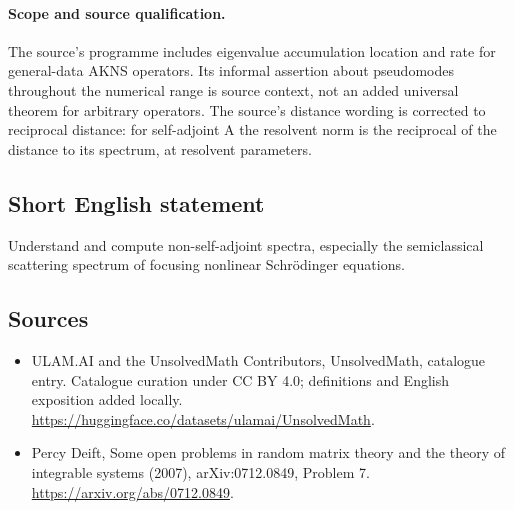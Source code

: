 \paragraph{Scope and source qualification.}The source’s programme includes eigenvalue accumulation location and rate for general-data AKNS operators. Its informal assertion about pseudomodes throughout the numerical range is source context, not an added universal theorem for arbitrary operators. The source’s distance wording is corrected to reciprocal distance: for self-adjoint A the resolvent norm is the reciprocal of the distance to its spectrum, at resolvent parameters.
\subsection{Short English statement}
Understand and compute non-self-adjoint spectra, especially the semiclassical scattering spectrum of focusing nonlinear Schrödinger equations.
\subsection{Sources}
\begin{itemize}
\item[\hypertarget{source:statement:1}{S1}] ULAM.AI and the UnsolvedMath Contributors, UnsolvedMath, catalogue entry. Catalogue curation under CC BY 4.0; definitions and English exposition added locally.
\url{https://huggingface.co/datasets/ulamai/UnsolvedMath}.
\item[\hypertarget{source:statement:2}{S2}] Percy Deift, Some open problems in random matrix theory and the theory of integrable systems (2007), arXiv:0712.0849, Problem 7.
\url{https://arxiv.org/abs/0712.0849}.
\end{itemize}
\label{end:statement}

